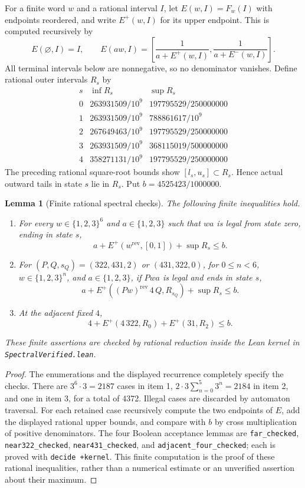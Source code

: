 \documentclass[11pt,a4paper]{article}
\newtheorem{lemma}[theorem]{Lemma}
\newcommand{\file}[1]{{\normalfont\small\nolinkurl{#1}}}
\begin{document}
For a finite word $w$ and a rational interval $I$, let $E(w,I)=F_w(I)$
with endpoints reordered, and write $E^+(w,I)$ for its upper endpoint.
This is computed recursively by
\[
 E(\varnothing,I)=I,\qquad
 E(a w,I)=\left[\frac1{a+E^+(w,I)},\frac1{a+E^-(w,I)}\right].
\]
All terminal intervals below are nonnegative, so no denominator vanishes.
Define rational outer intervals $R_s$ by
\[
\begin{array}{c|cc}
 s&\inf R_s&\sup R_s\\\hline
0&263931509/10^9&197795529/250000000\\
1&263931509/10^9&788861617/10^9\\
2&267649463/10^9&197795529/250000000\\
3&263931509/10^9&368115019/500000000\\
4&358271131/10^9&197795529/250000000
\end{array}
\]
The preceding rational square-root bounds show
$[l_s,u_s]\subset R_s$. Hence actual outward tails in state $s$ lie in $R_s$.
Put $b=4525423/1000000$.

\begin{lemma}[Finite rational spectral checks]\label{lem:finite}
The following finite inequalities hold.
\begin{enumerate}
\item For every $w\in\{1,2,3\}^6$ and $a\in\{1,2,3\}$ such that
$wa$ is legal from state zero, ending in state $s$,
\[
 a+E^+(w^{\mathrm{rev}},[0,1])+\sup R_s\le b.
\]
\item For $(P,Q,s_Q)=(322,431,2)$ or $(431,322,0)$,
for $0\le n<6$, $w\in\{1,2,3\}^n$, and $a\in\{1,2,3\}$,
if $Pwa$ is legal and ends in state $s$,
\[
 a+E^+((Pw)^{\mathrm{rev}}\,4\,Q,R_{s_Q})+\sup R_s\le b.
\]
\item At the adjacent fixed $4$,
\[
 4+E^+(4\,322,R_0)+E^+(31,R_2)\le b.
\]
\end{enumerate}
These finite assertions are checked by rational reduction inside the
Lean kernel in \file{SpectralVerified.lean}.
\end{lemma}
\begin{proof}
The enumerations and the displayed recurrence completely specify the
checks. There are $3^6\cdot3=2187$ cases in item 1,
$2\cdot3\sum_{n=0}^5 3^n=2184$ in item 2, and one in item 3,
for a total of 4372. Illegal cases are discarded by automaton traversal.
For each retained case recursively compute the two endpoints of $E$,
add the displayed rational upper bounds, and compare with $b$ by
cross multiplication of positive denominators. The four Boolean
acceptance lemmas are \file{far_checked}, \file{near322_checked},
\file{near431_checked}, and \file{adjacent_four_checked}; each is proved
with \file{decide +kernel}. This finite computation is the proof of
these rational inequalities, rather than a numerical estimate or an
unverified assertion about their maximum.
\end{proof}
\end{document}
